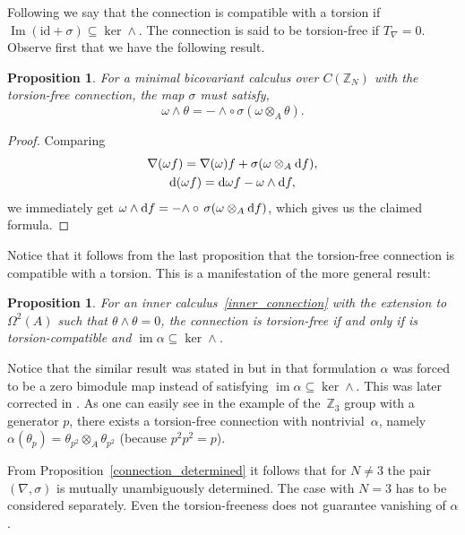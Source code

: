 \documentclass[pdftex]{sigma}
\numberwithin{equation}{section}
\newtheorem{Proposition}[Theorem]{Proposition}
 { \theoremstyle{definition}
\newtheorem{Definition}[Theorem]{Definition}
\newtheorem{Example}[Theorem]{Example}
\newtheorem{Remark}[Theorem]{Remark} }
\newcommand{\Z}{\mathbb{Z}}
\begin{document}
Following \cite{M13} we say that the connection is compatible with a torsion if $\operatorname{Im}(\mathrm{id}+\sigma)\subseteq \ker\wedge$.
The connection is said to be torsion-free if $T_\nabla=0$. Observe first that we have the following result.
\begin{Proposition}
For a minimal bicovariant calculus over $C(\Z_N)$ with the torsion-free connection, the map $\sigma$ must satisfy,
\begin{equation}
\omega \wedge \theta= - {\wedge} \circ \, \sigma(\omega \otimes_A \theta).
\label{sigmawedge}
\end{equation}
\end{Proposition}
\begin{proof}
Comparing
\begin{gather*}
\nabla(\omega f)=\nabla(\omega)f+\sigma(\omega\otimes_A {\rm d}f),\\
{\rm d}(\omega f)={\rm d}\omega f-\omega\wedge {\rm d}f,
\end{gather*}
we immediately get $ \omega \wedge {\rm d} f= - {\wedge}\circ\, \sigma(\omega \otimes_A {\rm d}f)$, which gives us the claimed formula.
\end{proof}

Notice that it follows from the last proposition that the torsion-free connection is compatible with a torsion. This is a manifestation of the more general result:
\begin{Proposition} For an inner calculus~\eqref{inner_connection} with the extension to $\Omega^2(A)$ such
that $\theta\wedge\theta=0$, the connection is torsion-free if and only if is torsion-compatible and $\operatorname{im} \alpha\subseteq\ker\wedge$.
\end{Proposition}
\begin{Remark}
Notice that the similar result was stated in \cite[Theorem~2.1(3)]{M13} but in that formulation $\alpha$ was forced to be a zero bimodule map instead of satisfying $\operatorname{im} \alpha\subseteq\ker\wedge$.
This was later corrected in \cite[Proposition~8.11]{BM_book}. As one can easily see in the example of the~$\mathbb{Z}_3$ group with
a generator $p$, there exists a torsion-free connection with nontrivial~$\alpha$, namely $\alpha(\theta_p)=\theta_{p^2}\otimes_A\theta_{p^2}$ (because $p^2 p^2 =p$).
\end{Remark}

From Proposition~\ref{connection_determined} it follows that for $N\neq 3$ the pair $(\nabla, \sigma)$ is mutually unambiguously determined. The case with $N=3$ has to be considered separately. Even the torsion-freeness does not guarantee vanishing of $\alpha$.
\end{document}
